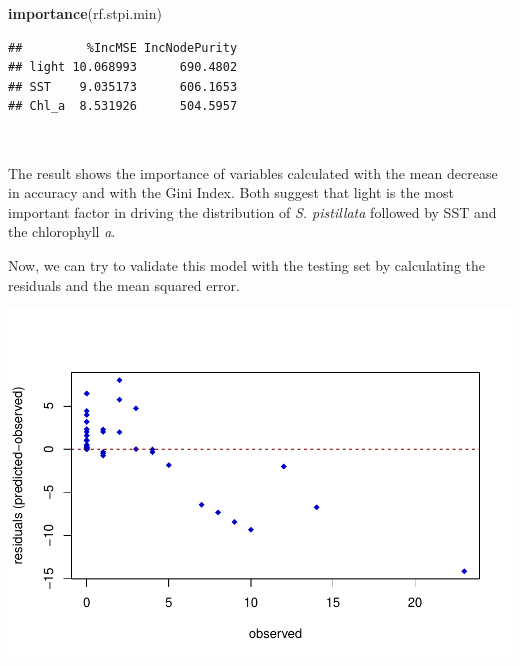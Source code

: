 \documentclass[
]{article}
\newenvironment{Shaded}{\begin{snugshade}}{\end{snugshade}}
\newcommand{\CommentTok}[1]{\textcolor[rgb]{0.56,0.35,0.01}{\textit{#1}}}
\newcommand{\DataTypeTok}[1]{\textcolor[rgb]{0.13,0.29,0.53}{#1}}
\newcommand{\DecValTok}[1]{\textcolor[rgb]{0.00,0.00,0.81}{#1}}
\newcommand{\KeywordTok}[1]{\textcolor[rgb]{0.13,0.29,0.53}{\textbf{#1}}}
\newcommand{\NormalTok}[1]{#1}
\newcommand{\OperatorTok}[1]{\textcolor[rgb]{0.81,0.36,0.00}{\textbf{#1}}}
\newcommand{\StringTok}[1]{\textcolor[rgb]{0.31,0.60,0.02}{#1}}
\begin{document}
\begin{Shaded}
\begin{Highlighting}[]
\KeywordTok{importance}\NormalTok{(rf.stpi.min)}
\end{Highlighting}
\end{Shaded}

\begin{verbatim}
##         %IncMSE IncNodePurity
## light 10.068993      690.4802
## SST    9.035173      606.1653
## Chl_a  8.531926      504.5957
\end{verbatim}

~

The result shows the importance of variables calculated with the mean
decrease in accuracy and with the Gini Index. Both suggest that light is
the most important factor in driving the distribution of \emph{S.
pistillata} followed by SST and the chlorophyll \emph{a}.

Now, we can try to validate this model with the testing set by
calculating the residuals and the mean squared error.

\begin{Shaded}
\end{Shaded}

\includegraphics{index_files/figure-latex/unnamed-chunk-11-1.pdf}
\end{document}

